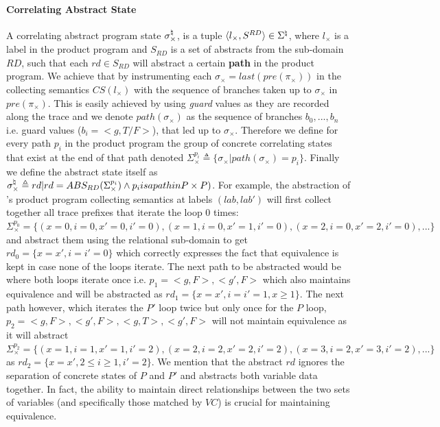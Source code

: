 \paragraph{Correlating Abstract State} 
A correlating abstract program state $\sigma_{\times}^\natural$, is a tuple $\langle l_{\times}, S^{RD} \rangle \in \Sigma^\natural$, where $l_{\times}$ is a label in the product program and $S_{RD}$ is a set of abstracts from the sub-domain $RD$, such that each $rd \in S_{RD}$ will abstract a certain \textbf{path} in the product program. We achieve that by instrumenting each $\sigma_{\times} = last(pre(\pi_{\times}))$ in the collecting semantics $CS(l_{\times})$ with the sequence of branches taken up to $\sigma_{\times}$ in $pre(\pi_{\times})$. This is easily achieved by using \emph{guard} values as they are recorded along the trace and we denote $path(\sigma_{\times})$ as the sequence of branches $b_0,...,b_n$ i.e. guard values ($b_i = <g,{T/F}>$), that led up to $\sigma_{\times}$. Therefore we define for every path $p_i$ in the product program the group of concrete correlating states that exist at the end of that path denoted $\Sigma_{\times}^{p_i} \triangleq \{ \sigma_{\times} | path(\sigma_{\times}) = p_i \}$. Finally we define the abstract state itself as $\sigma_{\times}^\natural \triangleq { rd | rd = ABS_{RD}(\Sigma_{\times}^{p_i}) \wedge p_i is a path in P \times P)}$. For example, the abstraction of 's product program collecting semantics at labels $(lab,lab')$ will first collect together all trace prefixes that iterate the loop 0 times: $\Sigma_{\times}^{p_0} = \{  (x=0,i=0,x'=0,i'=0), (x=1,i=0,x'=1,i'=0), (x=2,i=0,x'=2,i'=0), ... \}$ and abstract them using the relational sub-domain to get $rd_{0} = \{x=x',i=i'=0\}$ which correctly expresses the fact that equivalence is kept in case none of the loops iterate. The next path to be abstracted would be where both loops iterate once i.e. $p_1 = <g,F>,<g',F>$ which also maintains equivalence and will be abstracted as $rd_{1} = \{x=x',i=i'=1, x \geq 1\}$. The next path however, which iterates the $P'$ loop twice but only once for the $P$ loop, $p_2 = <g,F>,<g',F>,<g,T>,<g',F>$ will not maintain equivalence as it will abstract $\Sigma_{\times}^{p_2} = \{  (x=1,i=1,x'=1,i'=2), (x=2,i=2,x'=2,i'=2), (x=3,i=2,x'=3,i'=2), ... \}$ as $rd_{2} = \{x=x',2 \leq i \geq 1, i'=2\}$. We mention that the abstract $rd$ ignores the separation of concrete states of $P$ and $P'$ and abstracts both variable data together. In fact, the ability to maintain direct relationships between the two sets of variables (and specifically those matched by $VC$) is crucial for maintaining equivalence.
 
